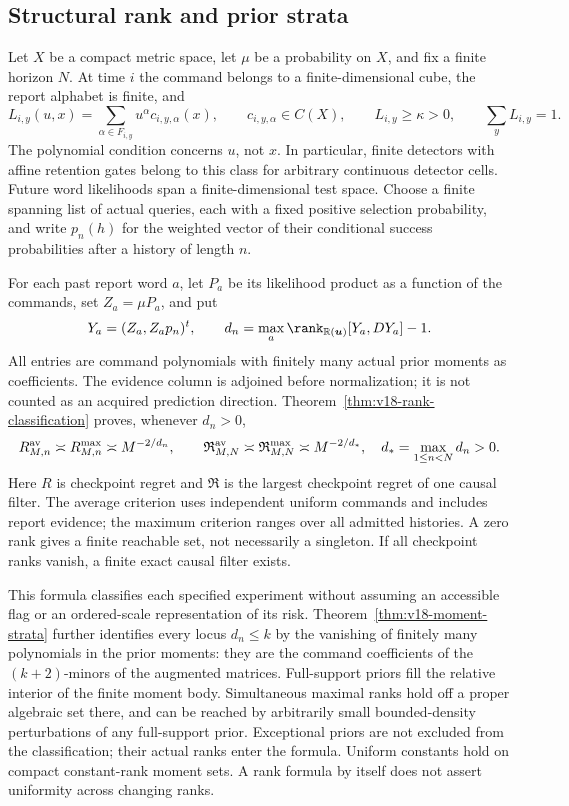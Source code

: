 \documentclass[11pt]{amsart}
\theoremstyle{definition}\newtheorem{definition}[theorem]{Definition}
\theoremstyle{remark}\newtheorem{remark}[theorem]{Remark}
\newcommand{\R}{\mathbb R}\newcommand{\N}{\mathbb N}\newcommand{\C}{\mathbb C}
\begin{document}
\subsection{Structural rank and prior strata}

Let $X$ be a compact metric space, let $\mu$ be a probability on $X$,
and fix a finite horizon $N$. At time $i$ the command belongs to a
finite-dimensional cube, the report alphabet is finite, and
\[
 L_{i,y}(u,x)=\sum_{\alpha\in F_{i,y}}u^\alpha c_{i,y,\alpha}(x),
 \qquad c_{i,y,\alpha}\in C(X),\qquad L_{i,y}\ge\kappa>0,
 \qquad\sum_yL_{i,y}=1.
\]
The polynomial condition concerns $u$, not $x$. In particular, finite
detectors with affine retention gates belong to this class for arbitrary
continuous detector cells. Future word likelihoods span a
finite-dimensional test space. Choose a finite spanning list of actual
queries, each with a fixed positive selection probability, and write
$p_n(h)$ for the weighted vector of their conditional success
probabilities after a history of length $n$.

For each past report word $a$, let $P_a$ be its likelihood product as a
function of the commands, set $Z_a=\mu P_a$, and put
\[
 Y_a=(Z_a,Z_ap_n)^t,\qquad
 d_n=\max_a\rank_{\R(\boldsymbol u)}[Y_a,DY_a]-1.
\]
All entries are command polynomials with finitely many actual prior
moments as coefficients. The evidence column is adjoined before
normalization; it is not counted as an acquired prediction direction.
Theorem~\ref{thm:v18-rank-classification} proves, whenever $d_n>0$,
\[
 R^{\rm av}_{M,n}\asymp R^{\rm max}_{M,n}\asymp M^{-2/d_n},
 \qquad
 \mathfrak R^{\rm av}_{M,N}\asymp
 \mathfrak R^{\rm max}_{M,N}\asymp M^{-2/d_*},
 \quad d_* =\max_{1\le n<N}d_n>0.
\]
Here $R$ is checkpoint regret and $\mathfrak R$ is the largest
checkpoint regret of one causal filter. The average criterion uses
independent uniform commands and includes report evidence; the maximum
criterion ranges over all admitted histories. A zero rank gives a
finite reachable set, not necessarily a singleton. If all checkpoint
ranks vanish, a finite exact causal filter exists.

This formula classifies each specified experiment without assuming an
accessible flag or an ordered-scale representation of its risk.
Theorem~\ref{thm:v18-moment-strata} further identifies every locus
$d_n\le k$ by the vanishing of finitely many polynomials in the prior
moments: they are the command coefficients of the $(k+2)$-minors of the
augmented matrices. Full-support priors fill the relative interior of the finite
moment body. Simultaneous maximal ranks hold off a proper algebraic
set there, and can be reached by arbitrarily small bounded-density
perturbations of any full-support prior. Exceptional priors are not
excluded from the classification; their actual ranks enter the formula.
Uniform constants hold on compact constant-rank moment sets. A rank
formula by itself does not assert uniformity across changing ranks.
\end{document}
